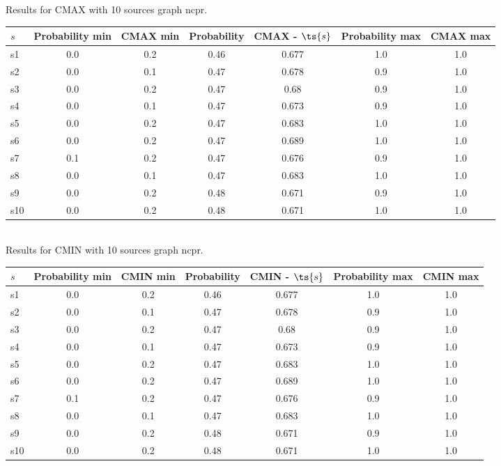 \documentclass{article}
\begin{document}
\noindent Results for CMAX with 10 sources graph ncpr.

\noindent\begin{tabular}{|l|c|c|c|c|c|c|}
\hline
$s$& Probability min & CMAX min & Probability & CMAX - $\ts{s}$ & Probability max & CMAX max\\
\hline
s1 &0.0 & 0.2 & 0.46 & 0.677 & 1.0 & 1.0\\
\hline
s2 &0.0 & 0.1 & 0.47 & 0.678 & 0.9 & 1.0\\
\hline
s3 &0.0 & 0.2 & 0.47 & 0.68 & 0.9 & 1.0\\
\hline
s4 &0.0 & 0.1 & 0.47 & 0.673 & 0.9 & 1.0\\
\hline
s5 &0.0 & 0.2 & 0.47 & 0.683 & 1.0 & 1.0\\
\hline
s6 &0.0 & 0.2 & 0.47 & 0.689 & 1.0 & 1.0\\
\hline
s7 &0.1 & 0.2 & 0.47 & 0.676 & 0.9 & 1.0\\
\hline
s8 &0.0 & 0.1 & 0.47 & 0.683 & 1.0 & 1.0\\
\hline
s9 &0.0 & 0.2 & 0.48 & 0.671 & 0.9 & 1.0\\
\hline
s10 &0.0 & 0.2 & 0.48 & 0.671 & 1.0 & 1.0\\
\hline
\end{tabular}\\

\noindent Results for CMIN with 10 sources graph ncpr.

\noindent\begin{tabular}{|l|c|c|c|c|c|c|}
\hline
$s$& Probability min & CMIN min & Probability & CMIN - $\ts{s}$ & Probability max & CMIN max\\
\hline
s1 &0.0 & 0.2 & 0.46 & 0.677 & 1.0 & 1.0\\
\hline
s2 &0.0 & 0.1 & 0.47 & 0.678 & 0.9 & 1.0\\
\hline
s3 &0.0 & 0.2 & 0.47 & 0.68 & 0.9 & 1.0\\
\hline
s4 &0.0 & 0.1 & 0.47 & 0.673 & 0.9 & 1.0\\
\hline
s5 &0.0 & 0.2 & 0.47 & 0.683 & 1.0 & 1.0\\
\hline
s6 &0.0 & 0.2 & 0.47 & 0.689 & 1.0 & 1.0\\
\hline
s7 &0.1 & 0.2 & 0.47 & 0.676 & 0.9 & 1.0\\
\hline
s8 &0.0 & 0.1 & 0.47 & 0.683 & 1.0 & 1.0\\
\hline
s9 &0.0 & 0.2 & 0.48 & 0.671 & 0.9 & 1.0\\
\hline
s10 &0.0 & 0.2 & 0.48 & 0.671 & 1.0 & 1.0\\
\hline
\end{tabular}\\
\end{document}
